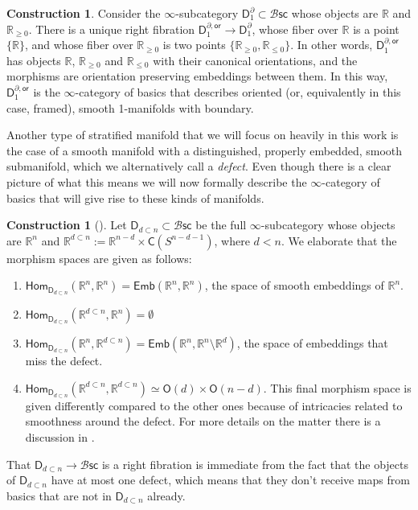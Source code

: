 \documentclass[12pt,a4paper]{article}
\newcounter{counter} \numberwithin{counter}{section}
\theoremstyle{definition}
\newtheorem{construction}[counter]{Construction}
\theoremstyle{plain}
\theoremstyle{remark}
\newcommand{\hoint}{\mathbb{R}_{\geq 0}}
\newcommand{\bsc}{\mathscr{B} \mathsf{sc}}
\begin{document}
\begin{construction}\label{con:d_1^bor_structure}
    Consider the $\infty$-subcategory $\mathsf{D}_1^{\partial} \subset \bsc$ whose objects are $\mathbb{R}$ and $\hoint$. There is a unique right fibration $\mathsf{D}_1^{\partial, \mathsf{or}} \rightarrow \mathsf{D}_1^{\partial}$, whose fiber over $\mathbb{R}$ is a point $\{ \mathbb{R}\}$, and whose fiber over $\hoint$ is two points $\{ \hoint, {\mathbb{R}_{\leq 0}} \}$. In other words, $\mathsf{D}_1^{\partial, \mathsf{or}}$ has objects $\mathbb{R}$, $\hoint$ and $\mathbb{R}_{\leq 0}$ with their canonical orientations, and the morphisms are orientation preserving embeddings between them. In this way, $\mathsf{D}_1^{\partial, \mathsf{or}}$ is the $\infty$-category of basics that describes oriented (or, equivalently in this case, framed), smooth 1-manifolds with boundary.
\end{construction}

Another type of stratified manifold that we will focus on heavily in this work is the case of a smooth manifold with a distinguished, properly embedded, smooth submanifold, which we alternatively call a \emph{defect}. Even though there is a clear picture of what this means we will now formally describe the $\infty$-category of basics that will give rise to these kinds of manifolds.

\begin{construction}[{\cite[ex.5.2.10]{aft_localstrut}}]
    Let $\mathsf{D}_{d \subset n} \subset \bsc$ be the full $\infty$-subcategory whose objects are $\mathbb{R}^n$ and $\mathbb{R}^{d \subset n} := \mathbb{R}^{n-d} \times \mathsf{C}(S^{n-d-1})$, where $d < n$. We elaborate that the morphism spaces are given as follows:
    \begin{enumerate}
        \item $\mathsf{Hom}_{\mathsf{D}_{d \subset n}} (\mathbb{R}^n, \mathbb{R}^n) = \mathsf{Emb}(\mathbb{R}^n, \mathbb{R}^n)$, the space of smooth embeddings of $\mathbb{R}^n$.
        \item $\mathsf{Hom}_{\mathsf{D}_{d \subset n}} (\mathbb{R}^{d \subset n}, \mathbb{R}^n) = \emptyset$
        \item $\mathsf{Hom}_{\mathsf{D}_{d \subset n}} (\mathbb{R}^n, \mathbb{R}^{d \subset n}) = \mathsf{Emb}(\mathbb{R}^n, \mathbb{R}^n \setminus \mathbb{R}^d)$, the space of embeddings that miss the defect.
        \item $\mathsf{Hom}_{\mathsf{D}_{d \subset n}} (\mathbb{R}^{d \subset n}, \mathbb{R}^{d \subset n}) \simeq \mathsf{O}(d) \times \mathsf{O}(n-d)$. This final morphism space is given differently compared to the other ones because of intricacies related to smoothness around the defect. For more details on the matter there is a discussion in \cite[ex.5.1.7]{aft_localstrut}.
    \end{enumerate}
    That $\mathsf{D}_{d \subset n} \rightarrow \bsc$ is a right fibration is immediate from the fact that the objects of $\mathsf{D}_{d \subset n}$ have at most one defect, which means that they don't receive maps from basics that are not in $\mathsf{D}_{d \subset n}$ already.
\end{construction}
\end{document}
